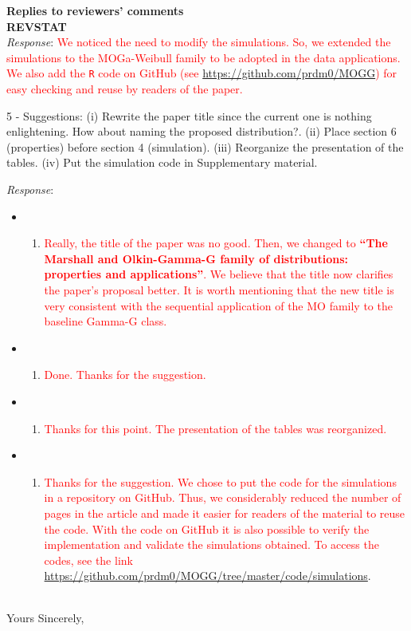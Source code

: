 \documentclass[version=last,12pt,{"maintainersDelight"}]{scrlttr2}
\providecommand{\tightlist}{%
  \setlength{\itemsep}{0pt}\setlength{\parskip}{0pt}}
\begin{document}
\begin{letter}{\textbf{Replies to reviewers' comments}\\\textbf{REVSTAT}\\}
\emph{Response}: \textcolor{red}{We noticed the need to modify the simulations. So, we extended the simulations to the MOGa-Weibull family to be adopted in the data applications. We also add 
the \texttt{R} code on GitHub (see \url{https://github.com/prdm0/MOGG}) for easy checking 
and reuse by readers of the paper.}


5 - Suggestions: (i) Rewrite the paper title since the current one is nothing enlightening. How about naming the proposed distribution?. (ii) Place section 6 (properties) before section 4 (simulation). (iii) Reorganize the presentation of the tables. (iv) Put the simulation code in Supplementary material.

\emph{Response}:

\begin{itemize}
\item
  \begin{enumerate}
  \def\labelenumi{(\roman{enumi})}
  \tightlist
  \item
    \textcolor{red}{Really, the title of the paper was no good. Then, we changed to \textbf{``The Marshall and Olkin-Gamma-G family of distributions: properties and applications''}. We believe that the title now clarifies the paper's proposal better. It is worth mentioning that the new title is very consistent with the sequential application of the MO family to the baseline Gamma-G class.}
  \end{enumerate}
\item
  \begin{enumerate}
  \def\labelenumi{(\roman{enumi})}
  \setcounter{enumi}{1}
  \tightlist
  \item
    \textcolor{red}{Done. Thanks for the suggestion.}
  \end{enumerate}
\item
  \begin{enumerate}
  \def\labelenumi{(\roman{enumi})}
  \setcounter{enumi}{2}
  \tightlist
  \item
    \textcolor{red}{Thanks for this point. The presentation of the tables was reorganized.}
  \end{enumerate}
\item
  \begin{enumerate}
  \def\labelenumi{(\roman{enumi})}
  \setcounter{enumi}{3}
  \tightlist
  \item
    \textcolor{red}{Thanks for the suggestion. We chose to put the code for the simulations in a repository on GitHub. Thus, we considerably reduced the number of pages in the article and made it easier for readers of the material to reuse the code. With the code on GitHub it is also possible to verify the implementation and validate the simulations obtained. To access the codes, see the link 
    \url{https://github.com/prdm0/MOGG/tree/master/code/simulations}}.\\\\
  \end{enumerate}
\end{itemize}

\closing{Yours Sincerely,}




 \end{letter}
\end{document}
